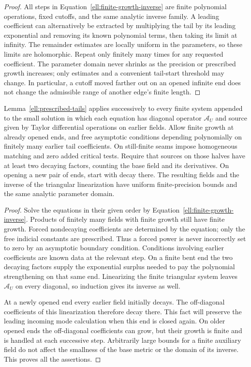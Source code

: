 \begin{proof}
All steps in Equation~\eqref{ell:finite-growth-inverse} are
finite polynomial operations, fixed cutoffs, and the same
analytic inverse family.  A leading coefficient can alternatively
be extracted by multiplying the tail by its leading exponential
and removing its known polynomial terms, then taking its limit
at infinity.  The remainder estimates are locally uniform in
the parameters, so these limits are holomorphic.  Repeat only
finitely many times for any requested coefficient.  The
parameter domain never shrinks as the precision or prescribed
growth increases; only estimates and a convenient tail-start
threshold may change.  In particular, a cutoff moved farther
out on an opened infinite end does not change the admissible
range of another edge's finite length.
\end{proof}

\begin{lemma}
\label{ell:triangular}
Lemma~\ref{ell:prescribed-tails} applies successively to every
finite system appended to the small solution in which each
equation has diagonal operator $\mathcal A_U$ and source given
by Taylor differential operations on earlier fields.  Allow
finite growth at already opened ends, and free asymptotic
conditions depending polynomially on finitely many earlier
tail coefficients.  On still-finite seams impose homogeneous
matching and zero added critical tests.  Require that sources
on those halves have at least two decaying factors, counting
the base field and its derivatives.  On opening a new pair
of ends, start with decay there.  The resulting fields and
the inverse of the triangular linearization have uniform
finite-precision bounds and the same analytic parameter domain.
\end{lemma}

\begin{proof}
Solve the equations in their given order by
Equation~\eqref{ell:finite-growth-inverse}.  Products of finitely
many fields with finite growth still have finite growth.
Forced nondecaying coefficients are determined by the equation;
only the free indicial constants are prescribed.  Thus a forced
power is never incorrectly set to zero by an asymptotic boundary
condition.  Conditions involving earlier coefficients are known
data at the relevant step.  On a finite bent end the two
decaying factors supply the exponential surplus needed to pay
the polynomial strengthening on that same end.  Linearizing
the finite triangular system leaves $\mathcal A_U$ on every
diagonal, so induction gives its inverse as well.

At a newly opened end every earlier field initially decays.
The off-diagonal coefficients of this linearization therefore
decay there.  This fact will preserve the leading incoming
mode calculation when this end is closed again.  On older
opened ends the off-diagonal coefficients can grow, but their
growth is finite and is handled at each successive step.
Arbitrarily large bounds for a finite auxiliary field do not
affect the smallness of the base metric or the domain of its
inverse.  This proves all the assertions.
\end{proof}

